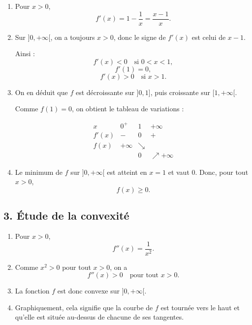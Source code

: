 \documentclass[11pt,a4paper]{article}
\begin{document}
\begin{enumerate}
    \item Pour \(x>0\),
    \[
    f'(x)=1-\frac{1}{x}=\frac{x-1}{x}.
    \]

    \item Sur \(]0,+\infty[\), on a toujours \(x>0\), donc le signe de \(f'(x)\) est celui de \(x-1\).

    Ainsi :
    \[
    f'(x)<0 \quad \text{si } 0<x<1,
    \]
    \[
    f'(1)=0,
    \]
    \[
    f'(x)>0 \quad \text{si } x>1.
    \]

    \item On en déduit que \(f\) est décroissante sur \(]0,1]\), puis croissante sur \([1,+\infty[\).

    Comme \(f(1)=0\), on obtient le tableau de variations :

    \[
    \begin{array}{c|ccc}
    x & 0^+ & 1 & +\infty \\
    \hline
    f'(x) & - & 0 & + \\
    \hline
    f(x) & +\infty & \searrow & \\
         &         & 0 & \nearrow +\infty
    \end{array}
    \]

    \item Le minimum de \(f\) sur \(]0,+\infty[\) est atteint en \(x=1\) et vaut \(0\). Donc, pour tout \(x>0\),
    \[
    f(x)\geq 0.
    \]
\end{enumerate}

\subsection*{3. Étude de la convexité}

\begin{enumerate}
    \item Pour \(x>0\),
    \[
    f''(x)=\frac{1}{x^2}.
    \]

    \item Comme \(x^2>0\) pour tout \(x>0\), on a
    \[
    f''(x)>0 \quad \text{pour tout } x>0.
    \]

    \item La fonction \(f\) est donc convexe sur \(]0,+\infty[\).

    \item Graphiquement, cela signifie que la courbe de \(f\) est tournée vers le haut et qu'elle est située au-dessus de chacune de ses tangentes.
\end{enumerate}
\end{document}
